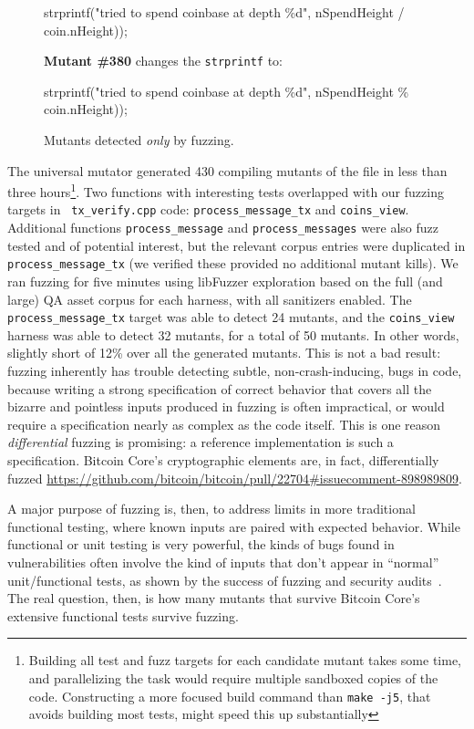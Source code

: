\begin{sloppypar}
\begin{figure}
\begin{code}
strprintf("tried to spend coinbase at depth \%d", nSpendHeight / coin.nHeight));
\end{code}
      
{\bf Mutant \#380} changes the {\tt strprintf} to:      

\begin{code}
strprintf("tried to spend coinbase at depth \%d", nSpendHeight \% coin.nHeight));
\end{code}
\caption{Mutants detected \emph{only} by fuzzing.}
\label{mkills}
\end{figure}

The universal mutator generated 430 compiling mutants of the file in
less than three hours\footnote{Building all test and fuzz targets for each
candidate mutant takes some time, and parallelizing the task would
require multiple sandboxed copies of the code. Constructing a more
focused build command than {\tt make -j5}, that avoids building most tests, might speed this up substantially}.
Two functions with interesting tests overlapped with our fuzzing targets in {\tt
  tx\_verify.cpp} code: {\tt process\_message\_tx} and {\tt coins\_view}.
Additional functions {\tt process\_message} and {\tt process\_messages} were
also fuzz tested and of potential interest, but the relevant corpus entries were
duplicated in {\tt process\_message\_tx} (we verified these provided no
additional mutant kills). We ran fuzzing for five minutes using
libFuzzer exploration based on the full (and large) QA asset corpus for each
harness, with all sanitizers enabled. The {\tt process\_message\_tx} target was
able to detect 24 mutants, and the {\tt coins\_view} harness was able to detect
32 mutants, for a total of 50 mutants. In other words, slightly short of 12\%
over all the generated mutants. This is not a bad result: fuzzing inherently has
trouble detecting subtle, non-crash-inducing, bugs in code, because writing a
strong specification of correct behavior that covers all the bizarre and
pointless inputs produced in fuzzing is often impractical, or would require a
specification nearly as complex as the code itself. This is one reason
\emph{differential} fuzzing is promising: a reference implementation is such a
specification. Bitcoin Core's cryptographic elements are, in fact,
differentially fuzzed
\url{https://github.com/bitcoin/bitcoin/pull/22704#issuecomment-898989809}.
\end{sloppypar}


A major purpose of fuzzing is, then, to address limits in more
traditional functional testing, where known inputs are paired with
expected behavior.  While functional or unit testing is very powerful,
the kinds of bugs found in vulnerabilities often involve the kind of
inputs that don't appear in ``normal'' unit/functional tests, as shown
by the success of fuzzing and security audits~\cite{FC20}.  The real
question, then, is how many mutants that survive Bitcoin Core's
extensive functional tests survive fuzzing.

